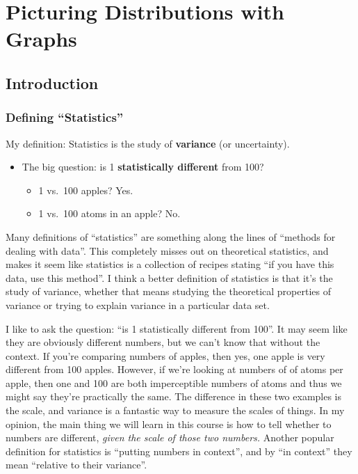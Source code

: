 \documentclass[
  letterpaper,
  DIV=11,
  numbers=noendperiod]{scrreprt}
\providecommand{\tightlist}{%
  \setlength{\itemsep}{0pt}\setlength{\parskip}{0pt}}\usepackage{longtable,booktabs,array}
\begin{document}
\hypertarget{picturing-distributions-with-graphs}{%
\chapter{Picturing Distributions with
Graphs}\label{picturing-distributions-with-graphs}}

\hypertarget{introduction-1}{%
\section{Introduction}\label{introduction-1}}

\hypertarget{defining-statistics}{%
\subsection{Defining ``Statistics''}\label{defining-statistics}}

My definition: Statistics is the study of \textbf{variance} (or
uncertainty).

\begin{itemize}
\tightlist
\item
  The big question: is 1 \textbf{statistically different} from 100?

  \begin{itemize}
  \tightlist
  \item
    1 vs.~100 apples? Yes.
  \item
    1 vs.~100 atoms in an apple? No.
  \end{itemize}
\end{itemize}

Many definitions of ``statistics'' are something along the lines of
``methods for dealing with data''. This completely misses out on
theoretical statistics, and makes it seem like statistics is a
collection of recipes stating ``if you have this data, use this
method''. I think a better definition of statistics is that it's the
study of variance, whether that means studying the theoretical
properties of variance or trying to explain variance in a particular
data set.

I like to ask the question: ``is 1 statistically different from 100''.
It may seem like they are obviously different numbers, but we can't know
that without the context. If you're comparing numbers of apples, then
yes, one apple is very different from 100 apples. However, if we're
looking at numbers of of atoms per apple, then one and 100 are both
imperceptible numbers of atoms and thus we might say they're practically
the same. The difference in these two examples is the scale, and
variance is a fantastic way to measure the scales of things. In my
opinion, the main thing we will learn in this course is how to tell
whether to numbers are different, \emph{given the scale of those two
numbers.} Another popular definition for statistics is ``putting numbers
in context'', and by ``in context'' they mean ``relative to their
variance''.
\end{document}
